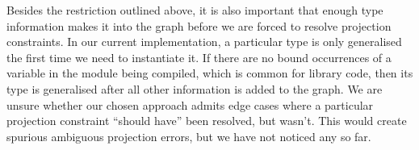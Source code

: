 Besides the restriction outlined above, it is also important that enough type information makes it into the graph before we are forced to resolve projection constraints. In our current implementation, a particular type is only generalised the first time we need to instantiate it. If there are no bound occurrences of a variable in the module being compiled, which is common for library code, then its type is generalised after all other information is added to the graph. We are unsure whether our chosen approach admits edge cases where a particular projection constraint ``should have'' been resolved, but wasn't. This would create spurious ambiguous projection errors, but we have not noticed any so far.




 




